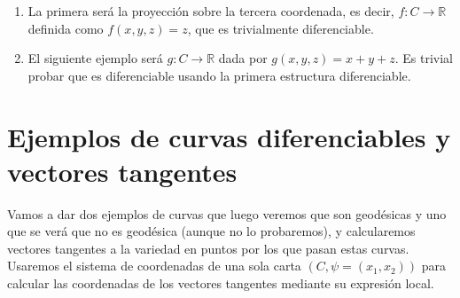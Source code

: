 \documentclass[twoside, 11pt]{article}
\theoremstyle{definition}
\newcommand{\R}{\mathbb{R}}
\begin{document}
\begin{enumerate}


\item
 La primera será la proyección sobre la tercera coordenada, es decir, $f:C\to\R$ definida como $f(x,y,z)=z$, que es trivialmente diferenciable. 

\item
 El siguiente ejemplo será $g:C\to\R$ dada por $g(x,y,z)=x+y+z$. Es trivial probar que es diferenciable usando la primera estructura diferenciable. 

\end{enumerate}


\section{Ejemplos de curvas diferenciables y vectores tangentes}



Vamos a dar dos ejemplos de curvas que luego veremos que son geodésicas y uno que se verá que no es geodésica (aunque no lo probaremos), y calcularemos vectores tangentes a la variedad en puntos por los que pasan estas curvas. Usaremos el sistema de coordenadas de una sola carta $(C, \psi=(x_1,x_2))$ para calcular las coordenadas de los vectores tangentes mediante su expresión local.

%
%
%
\end{document}
